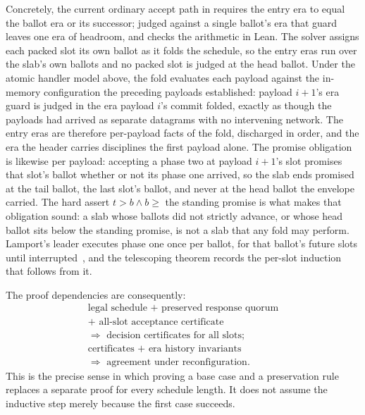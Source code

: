 Concretely, the current ordinary accept path in
 requires the entry era to equal the ballot era
or its successor; judged against a single ballot's era that guard leaves one
era of headroom, and  checks the arithmetic in
Lean. The solver assigns each packed slot its own ballot as it
folds the schedule, so the entry eras run over the slab's own ballots and no
packed slot is judged at the head ballot. Under the atomic handler
model above, the fold evaluates each payload against the in-memory
configuration the preceding payloads established: payload $i{+}1$'s era
guard is judged in the era payload $i$'s commit folded, exactly as though
the payloads had arrived as separate datagrams with no intervening network.
The entry eras are therefore per-payload facts of the fold, discharged in
order, and the era the header carries disciplines the first payload alone.
The promise obligation is likewise per payload: accepting a phase two at
payload $i{+}1$'s slot promises that slot's ballot whether or not its phase one
arrived, so the slab ends promised at the tail ballot, the last slot's ballot,
and never at the head ballot the envelope carried. The hard assert
$t>b\wedge b\geq$ the standing promise is what makes that obligation sound:
a slab whose ballots did not strictly advance, or whose head ballot sits below
the standing promise, is not a slab that any fold may perform. Lamport's
leader executes phase one once per ballot, for that ballot's future slots
until interrupted~\cite{fuse-paxos}, and the telescoping theorem records the
per-slot induction that follows from it.

The proof dependencies are consequently:
\[
\begin{gathered}
\text{legal schedule + preserved response quorum}\\
{}+\text{ all-slot acceptance certificate}\\
\Longrightarrow\text{ decision certificates for all slots};\\
\text{certificates + era history invariants}\\
\Longrightarrow\text{ agreement under reconfiguration}.
\end{gathered}
\]
This is the precise sense in which proving a base case and a preservation rule
replaces a separate proof for every schedule length. It does not assume the
inductive step merely because the first case succeeds.

